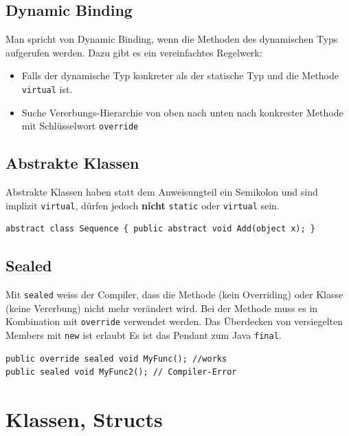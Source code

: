 \documentclass[
a4paper,
oneside,
10pt,
fleqn,
headsepline,
toc=listofnumbered, 
bibliography=totocnumbered]{scrartcl}
\let\stdsection\section
\renewcommand\section{\clearpage\stdsection}
\begin{document}
\subsection{Dynamic Binding}
Man spricht von Dynamic Binding, wenn die Methoden des dynamischen Typs aufgerufen werden. Dazu gibt es ein vereinfachtes Regelwerk:
\begin{itemize}
    \item Falls der dynamische Typ konkreter als der statische Typ und die Methode \lstinline|virtual| ist.
    \item Suche Vererbungs-Hierarchie von oben nach unten nach konkrester Methode mit Schlüsselwort \lstinline|override| 
\end{itemize}

\subsection{Abstrakte Klassen}
Abstrakte Klassen haben statt dem Anweisungteil ein Semikolon und sind implizit \lstinline|virtual|, dürfen jedoch \textbf{nicht} \lstinline|static| oder \lstinline|virtual| sein.
\begin{lstlisting}
abstract class Sequence { public abstract void Add(object x); }
\end{lstlisting}

\subsection{Sealed}
Mit \lstinline|sealed| weiss der Compiler, dass die Methode (kein Overriding) oder Klasse (keine Vererbung) nicht mehr verändert wird.
Bei der Methode muss es in Kombination mit \lstinline|override| verwendet werden.
Das Überdecken von versiegelten Members mit \lstinline|new| ist erlaubt 
Es ist das Pendant zum Java \lstinline|final|.
\begin{lstlisting} 
public override sealed void MyFunc(); //works
public sealed void MyFunc2(); // Compiler-Error
\end{lstlisting}

\section{Klassen, Structs}
\end{document}
